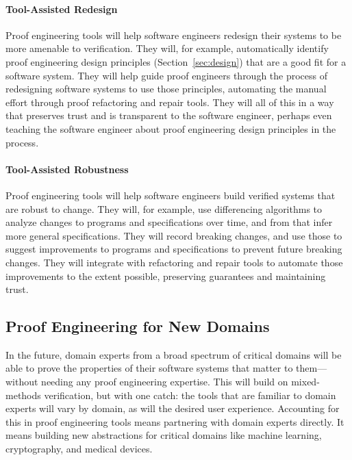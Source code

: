 \paragraph{Tool-Assisted Redesign} 
Proof engineering tools will help software engineers redesign their systems to be more amenable to verification.
They will, for example, automatically identify proof engineering design principles (Section~\ref{sec:design})
that are a good fit for a software system.
They will help guide proof engineers through the process of redesigning software systems to use those principles,
automating the manual effort through proof refactoring and repair tools.
They will all of this in a way that preserves trust and is transparent to the software engineer,
perhaps even teaching the software engineer about proof engineering design principles in the process.

\paragraph{Tool-Assisted Robustness}
Proof engineering tools will help software engineers build verified systems that are robust to change.
They will, for example, use differencing algorithms to analyze changes to programs and specifications over time,
and from that infer more general specifications.
They will record breaking changes, and use those to suggest improvements to programs and specifications to prevent future breaking changes.
They will integrate with refactoring and repair tools to automate those improvements to the extent possible,
preserving guarantees and maintaining trust.

\subsection*{Proof Engineering for New Domains}

In the future, domain experts from a broad spectrum of critical domains will be able to prove the properties
of their software systems that matter to them---without needing any proof engineering expertise.
This will build on mixed-methods verification, but with one catch:
the tools that are familiar to domain experts will vary by domain, as will the desired user experience.
Accounting for this in proof engineering tools means partnering with domain experts directly.
It means building new abstractions for critical domains like machine learning, cryptography, and medical devices.


